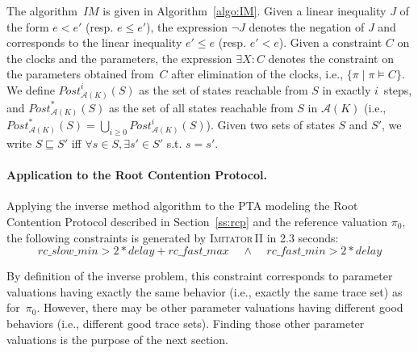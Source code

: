 \documentclass[a4paper,10pt]{article}
\newcommand{\A}{\mathcal{A}}
\newcommand{\rcpFMax}{\mathit{rc\_fast\_max}}
\newcommand{\rcpFMin}{\mathit{rc\_fast\_min}}
\newcommand{\rcpSMax}{\mathit{rc\_slow\_max}}
\newcommand{\rcpSMin}{\mathit{rc\_slow\_min}}
\newcommand{\rcpD}{\mathit{delay}}
\newcommand{\IM}{\mathit{IM}}
\newcommand{\imitatordeux}{\textsc{Imitator}\,II}
\newcommand{\paragraphe}[1]{\paragraph{#1.}}
\begin{document}
The algorithm~$\IM$ is given in Algorithm~\ref{algo:IM}.
Given a linear inequality $J$ of the form $e < e'$ (resp. $e \leq e'$), the expression $\neg J$ denotes the negation of $J$ and corresponds to the linear inequality $e' \leq e$ (resp. $e' < e$).
% 
Given a constraint $C$ on the clocks and the parameters, the expression $\exists X: C$ denotes the constraint on the parameters obtained from~$C$ after elimination of the clocks, i.e., $\{ \pi \mid \pi \models C\}$.
% 
We define $\mathit{Post}_{\A(K)}^i(S)$ as the set of states reachable from $S$ in exactly $i$~steps,
and $\mathit{Post}_{\A(K)}^*(S)$ as the set of all states reachable from $S$ in $\A(K)$
(i.e., $\mathit{Post}_{\A(K)}^*(S)=\bigcup_{i\geq 0 }\mathit{Post}_{\A(K)}^i(S)$).
Given two sets of states $S$ and $S'$, we write $S \sqsubseteq S' $ iff
$\forall s \in S , \exists s' \in S' $ s.t. $s = s'$.


\paragraphe{Application to the Root Contention Protocol}
Applying the inverse method algorithm to the PTA modeling the Root Contention Protocol described in Section~\ref{ss:rcp} and the reference valuation $\pi_0$, the following constraints is generated
by \imitatordeux{}
in 2.3 seconds: %
$$ \rcpSMin > 2 * \rcpD + \rcpFMax
\ \ \ \ \ 
 \land \ \ \ \ \ \rcpFMin > 2 * \rcpD$$


By definition of the inverse problem, this constraint corresponds to parameter valuations having exactly the same behavior (i.e., exactly the same trace set) as for~$\pi_0$.
However, there may be other parameter valuations having different good behaviors (i.e., different good trace sets). %
Finding those other parameter valuations is the purpose of the next section.
\end{document}
